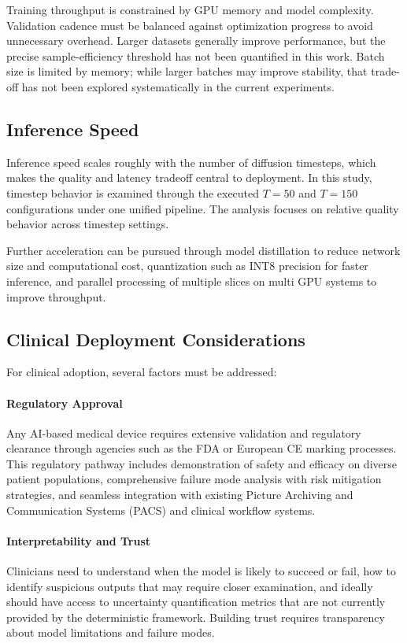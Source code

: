 Training throughput is constrained by GPU memory and model complexity. Validation cadence must be balanced against optimization progress to avoid unnecessary overhead. Larger datasets generally improve performance, but the precise sample-efficiency threshold has not been quantified in this work. Batch size is limited by memory; while larger batches may improve stability, that trade-off has not been explored systematically in the current experiments.

\subsection{Inference Speed}

Inference speed scales roughly with the number of diffusion timesteps, which makes the quality and latency tradeoff central to deployment. In this study, timestep behavior is examined through the executed \(T=50\) and \(T=150\) configurations under one unified pipeline. The analysis focuses on relative quality behavior across timestep settings.

Further acceleration can be pursued through model distillation to reduce network size and computational cost, quantization such as INT8 precision for faster inference, and parallel processing of multiple slices on multi GPU systems to improve throughput.

\subsection{Clinical Deployment Considerations}

For clinical adoption, several factors must be addressed:

\paragraph{Regulatory Approval} Any AI-based medical device requires extensive validation and regulatory clearance through agencies such as the FDA or European CE marking processes. This regulatory pathway includes demonstration of safety and efficacy on diverse patient populations, comprehensive failure mode analysis with risk mitigation strategies, and seamless integration with existing Picture Archiving and Communication Systems (PACS) and clinical workflow systems.

\paragraph{Interpretability and Trust} Clinicians need to understand when the model is likely to succeed or fail, how to identify suspicious outputs that may require closer examination, and ideally should have access to uncertainty quantification metrics that are not currently provided by the deterministic framework. Building trust requires transparency about model limitations and failure modes.

